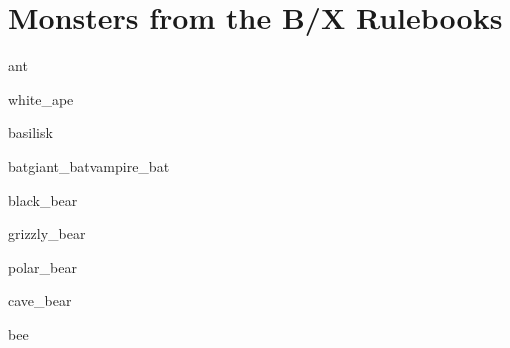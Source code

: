 \documentclass[letterpaper,serif]{module}
\begin{document}
\raggedbottom

\part{Monsters from the B/X Rulebooks}

\begin{newmonster}{ant}
\lipsum[1]
\end{newmonster}

\begin{newmonster}{white_ape}\end{newmonster}

\begin{newmonster}{basilisk}\end{newmonster}



\begin{newmonster3}{bat}{giant_bat}{vampire_bat}
\lipsum[1]
\end{newmonster3}




\begin{newmonster}{black_bear}\end{newmonster}

\begin{newmonster}{grizzly_bear}\end{newmonster}

\begin{newmonster}{polar_bear}\end{newmonster}

\begin{newmonster}{cave_bear}\end{newmonster}

\begin{newmonster}{bee}\end{newmonster}
\end{document}
